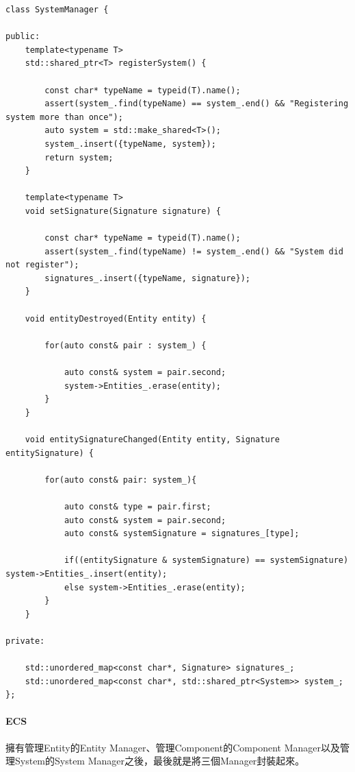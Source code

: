 \begin{lstlisting}
class SystemManager {

public:
    template<typename T>
    std::shared_ptr<T> registerSystem() {

        const char* typeName = typeid(T).name();
        assert(system_.find(typeName) == system_.end() && "Registering system more than once");
        auto system = std::make_shared<T>();
        system_.insert({typeName, system});
        return system;
    }

    template<typename T>
    void setSignature(Signature signature) {

        const char* typeName = typeid(T).name();
        assert(system_.find(typeName) != system_.end() && "System did not register");
        signatures_.insert({typeName, signature});
    }

    void entityDestroyed(Entity entity) {

        for(auto const& pair : system_) {

            auto const& system = pair.second;
            system->Entities_.erase(entity);
        }
    }

    void entitySignatureChanged(Entity entity, Signature entitySignature) {

        for(auto const& pair: system_){

            auto const& type = pair.first;
            auto const& system = pair.second;
            auto const& systemSignature = signatures_[type];

            if((entitySignature & systemSignature) == systemSignature) system->Entities_.insert(entity);
            else system->Entities_.erase(entity);
        }
    }

private:

    std::unordered_map<const char*, Signature> signatures_;
    std::unordered_map<const char*, std::shared_ptr<System>> system_; 
};
\end{lstlisting}

\paragraph{ECS}

擁有管理Entity的Entity Manager、管理Component的Component Manager以及管理System的System Manager之後，最後就是將三個Manager封裝起來。

